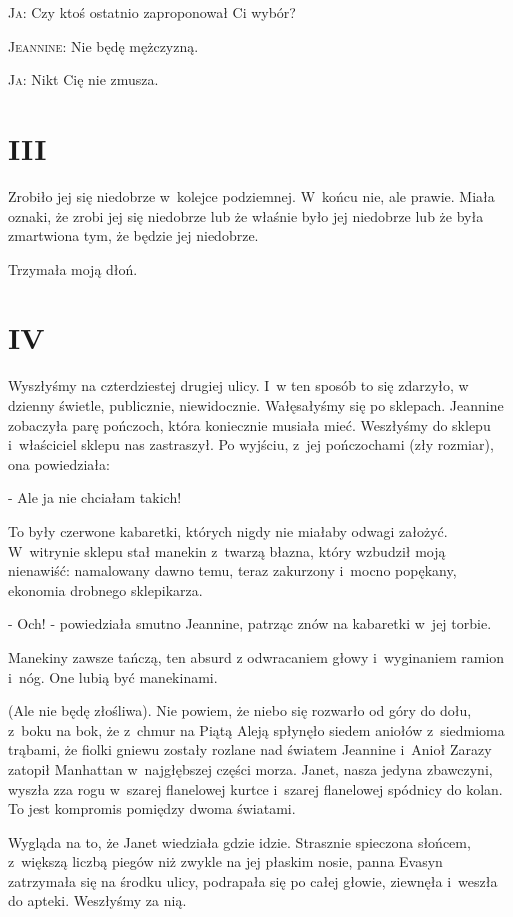 \documentclass[oneside,polish,12pt,sfheadings]{mwbk}
\begin{document}
\textsc{Ja}: Czy ktoś ostatnio zaproponował Ci wybór?

\textsc{Jeannine}: Nie będę mężczyzną.

\textsc{Ja}: Nikt Cię nie zmusza.

\chapter{III}

Zrobiło jej się niedobrze w~kolejce podziemnej. W~końcu nie, ale prawie.
Miała oznaki, że zrobi jej się niedobrze lub że właśnie było jej niedobrze
lub że była zmartwiona tym, że będzie jej niedobrze.

Trzymała moją dłoń.

\chapter{IV}

Wyszłyśmy na czterdziestej drugiej ulicy. I~w ten sposób to się zdarzyło,
w dzienny świetle, publicznie, niewidocznie. Wałęsałyśmy się po sklepach.
Jeannine zobaczyła parę pończoch, która koniecznie musiała mieć. Weszłyśmy
do sklepu i~właściciel sklepu nas zastraszył. Po wyjściu, z~jej pończochami
(zły rozmiar), ona powiedziała: 

- Ale ja nie chciałam takich! 

To były czerwone kabaretki, których nigdy nie miałaby odwagi założyć. W~witrynie
sklepu stał manekin z~twarzą błazna, który wzbudził moją nienawiść:
namalowany dawno temu, teraz zakurzony i~mocno popękany, ekonomia
drobnego sklepikarza. 

- Och! - powiedziała smutno Jeannine, patrząc
znów na kabaretki w~jej torbie. 

Manekiny zawsze tańczą, ten absurd
z odwracaniem głowy i~wyginaniem ramion i~nóg. One lubią być manekinami.

(Ale nie będę złośliwa). Nie powiem, że niebo się rozwarło od góry
do dołu, z~boku na bok, że z~chmur na Piątą Aleją spłynęło siedem
aniołów z~siedmioma trąbami, że fiolki gniewu zostały rozlane nad
światem Jeannine i~Anioł Zarazy zatopił Manhattan w~najgłębszej części
morza. Janet, nasza jedyna zbawczyni, wyszła zza rogu w~szarej flanelowej
kurtce i~szarej flanelowej spódnicy do kolan. To jest kompromis pomiędzy
dwoma światami.

Wygląda na to, że Janet wiedziała gdzie idzie. Strasznie spieczona
słońcem, z~większą liczbą piegów niż zwykle na jej płaskim nosie,
panna Evasyn zatrzymała się na środku ulicy, podrapała się po całej
głowie, ziewnęła i~weszła do apteki. Weszłyśmy za nią.
\end{document}
